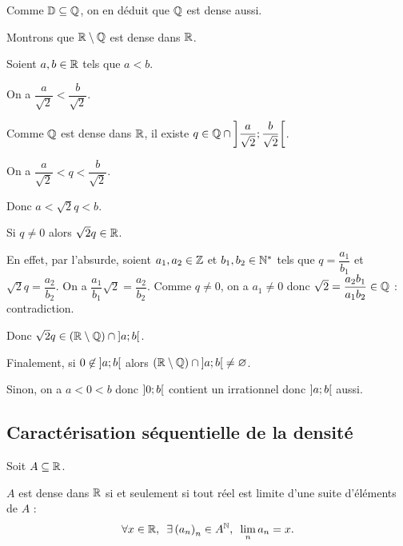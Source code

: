 \begin{dem}[2]
Comme \(\mathbb{D}\subseteq\mathbb{Q}\), on en déduit que \(\mathbb{Q}\) est dense aussi.
\end{dem}

\begin{dem}[3]
Montrons que \(\mathbb{R}\setminus\mathbb{Q}\) est dense dans \(\mathbb{R}\).

Soient \(a,b\in\mathbb{R}\) tels que \(a<b\).

On a \(\dfrac{a}{\sqrt{2}}<\dfrac{b}{\sqrt{2}}\).

Comme \(\mathbb{Q}\) est dense dans \(\mathbb{R}\), il existe \(q\in\mathbb{Q}\cap\left]\dfrac{a}{\sqrt{2}};\dfrac{b}{\sqrt{2}}\right[\).

On a \(\dfrac{a}{\sqrt{2}}<q<\dfrac{b}{\sqrt{2}}\).

Donc \(a<\sqrt{2}q<b\).

Si \(q\not=0\) alors \(\sqrt{2}q\in\mathbb{R}\).

En effet, par l'absurde, soient \(a_1,a_2\in\mathbb{Z}\) et \(b_1,b_2\in\mathbb{N}^*\) tels que \(q=\dfrac{a_1}{b_1}\) et \(\sqrt{2}q=\dfrac{a_2}{b_2}\). On a \(\dfrac{a_1}{b_1}\sqrt{2}=\dfrac{a_2}{b_2}\). Comme \(q\not=0\), on a \(a_1\not=0\) donc \(\sqrt{2}=\dfrac{a_2b_1}{a_1b_2}\in\mathbb{Q}\) : contradiction.

Donc \(\sqrt{2}q\in\left(\mathbb{R}\setminus\mathbb{Q}\right)\cap\left]a;b\right[\).

Finalement, si \(0\not\in\left]a;b\right[\) alors \(\left(\mathbb{R}\setminus\mathbb{Q}\right)\cap\left]a;b\right[\not=\varnothing\).

Sinon, on a \(a<0<b\) donc \(\left]0;b\right[\) contient un irrationnel donc \(\left]a;b\right[\) aussi.
\end{dem}

\subsection{Caractérisation séquentielle de la densité}

\begin{prop}
Soit \(A\subseteq\mathbb{R}\).

\(A\) est dense dans \(\mathbb{R}\) si et seulement si tout réel est limite d'une suite d'éléments de \(A\) : \[\quantifs{\forall x\in\R;\exists\paren{a_n}_n\in A^\N}\lim_na_n=x.\]
\end{prop}

